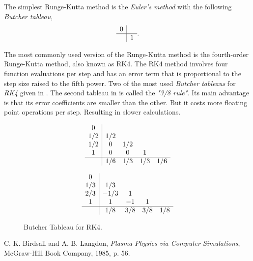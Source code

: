 \documentclass{article}
\begin{document}
The simplest Runge-Kutta method is the \textit{Euler's method} with the following \textit{Butcher tableau},
\[ 
    \begin{array} 
        {c|cccc}
        0\\
        \hline
        & 1
    \end{array} .
\] 

The most commonly used version of the Runge-Kutta method is the fourth-order Runge-Kutta method, also known as RK4. 
The RK4 method involves four function evaluations per step and has an error term that is proportional to the step size raised to the fifth power.
Two of the most used \textit{Butcher tableaus} for \textit{RK4} given in .
The second tableau in  is called the \textit{"3/8 rule"}. Its main advantage is that its error coefficients are smaller than the other. But it costs more floating point operations per step. 
Resulting in slower calculations. 

\begin{figure}[h!]
    \centering
    \begin{minipage}{.5\textwidth}
        \[ 
        \begin{array} 
            {c|cccc}
            0\\
            1/2 & 1/2 \\
            1/2 & 0 & 1/2 \\
            1   & 0 & 0 & 1\\
            \hline
            & 1/6 & 1/3 & 1/3 & 1/6
        \end{array}
        \]  
    \end{minipage}%
    \begin{minipage}{.5\textwidth}
        \[ 
        \begin{array} 
            {c|cccc}
            0\\
            1/3 & 1/3 \\
            2/3 & -1/3 & 1 \\
            1   & 1 & -1 & 1\\
            \hline
            & 1/8 & 3/8 & 3/8 & 1/8
        \end{array}
        \]  
    \end{minipage}
    \vspace{20pt}
    \caption{Butcher Tableau for RK4.}
    \label{fig:Butcher-RK4}
\end{figure}



\begin{thebibliography}{9}
C. K. Birdsall and A. B. Langdon, \emph{Plasma Physics via Computer Simulations}, McGraw-Hill Book Company, 1985, p. 56.
\end{thebibliography}
\end{document}
